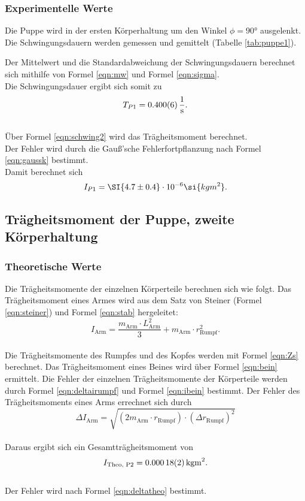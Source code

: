 \subsubsection{Experimentelle Werte}
Die Puppe wird in der ersten Körperhaltung um den Winkel $\phi=90°$ ausgelenkt.
Die Schwingungsdauern werden gemessen und gemittelt (Tabelle \ref{tab:puppe1}).

Der Mittelwert und die Standardabweichung der Schwingungsdauern berechnet sich mithilfe von Formel \eqref{eqn:mw} und Formel \eqref{eqn:sigma}.
\\Die Schwingungsdauer ergibt sich somit zu
\begin{equation*}
  T_{P1}= \SI{0.4 \pm 0.006}{\frac{1}{s}}.
\end{equation*}
\\Über Formel \eqref{eqn:schwing2} wird das Trägheitsmoment berechnet.
\\Der Fehler wird durch die Gauß'sche Fehlerfortpflanzung nach Formel \eqref{eqn:gaussk} bestimmt.
\\Damit berechnet sich
\begin{equation*}
  I_{P1}= \SI{4.7 \pm  0.4} \cdot10^{-6} \si{kg m^2}.
\end{equation*}


\subsection{Trägheitsmoment der Puppe, zweite Körperhaltung}

\subsubsection{Theoretische Werte}
Die Trägheitsmomente der einzelnen Körperteile berechnen sich wie folgt.
Das Trägheitsmoment eines Armes wird aus dem Satz von Steiner (Formel \eqref{eqn:steiner}) und Formel \eqref{eqn:stab} hergeleitet:
\begin{equation*}
  I_{\text{Arm}}= \frac{m_{\text{Arm}} \cdot L_{\text{Arm}}^2}{3} + m_{\text{Arm}} \cdot r_{\text{Rumpf}}^2.
\end{equation*}
\\Die Trägheitsmomente des Rumpfes und des Kopfes werden mit Formel \eqref{eqn:Zs} berechnet.
Das Trägheitsmoment eines Beines wird über Formel \eqref{eqn:bein} ermittelt.
Die Fehler der einzelnen Trägheitsmomente der Körperteile werden durch Formel \eqref{eqn:deltairumpf} und Formel \eqref{eqn:ibein} bestimmt.
Der Fehler des Trägheitsmoments eines Arms errechnet sich durch
\begin{equation*}
  \Delta I_{\text{Arm}}= \sqrt{ \left( 2m_{\text{Arm}} \cdot r_{\text{Rumpf}} \right) \cdot (\Delta r_{\text{Rumpf}})^2 }
\end{equation*}
\\Daraus ergibt sich ein Gesamtträgheitsmoment von
\begin{equation*}
  I_{\text{Theo, P2}}= \SI{0.00018 \pm 0.00002}{kg m^2}.
\end{equation*}
\\Der Fehler wird nach Formel \eqref{eqn:deltatheo} bestimmt.


